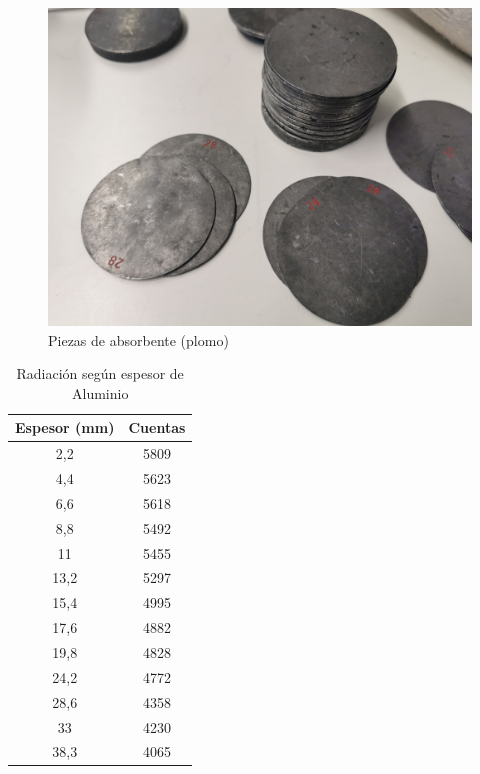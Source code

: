 \documentclass[a4paper,12pt,spanish]{article}
\begin{document}
	\begin{figure}[H]
		\centering
		\includegraphics[width=0.7\linewidth]{images/IMG_20240305_121157}
		\caption{Piezas de absorbente (plomo)}
		\label{fig:img20240305121157}
	\end{figure}
	
	
	\begin{table}[H]
		\centering
		\begin{tabular}{|c|c|}
			\hline
			Espesor (mm) & Cuentas \\ \hline
			2,2             & 5809    \\ \hline
			4,4             & 5623    \\ \hline
			6,6             & 5618    \\ \hline
			8,8             & 5492    \\ \hline
			11              & 5455    \\ \hline
			13,2            & 5297    \\ \hline
			15,4            & 4995    \\ \hline
			17,6            & 4882    \\ \hline
			19,8            & 4828    \\ \hline
			24,2            & 4772    \\ \hline
			28,6            & 4358    \\ \hline
			33              & 4230    \\ \hline
			38,3            & 4065    \\ \hline
		\end{tabular}
		\caption{Radiación según espesor de Aluminio}
	\end{table}
	
	
	
	
	
\end{document}
